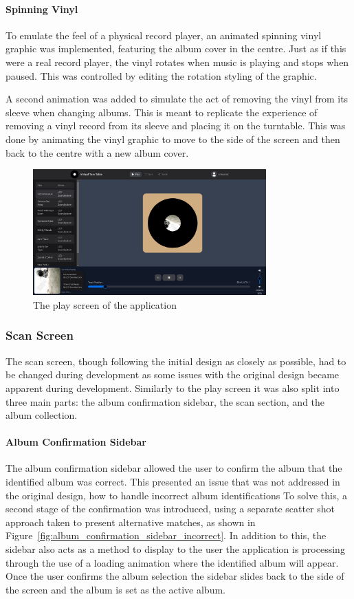 \paragraph{Spinning Vinyl}
To emulate the feel of a physical record player, an animated spinning vinyl graphic was implemented, featuring the album cover in the centre. Just as if this were a real record player, the vinyl rotates when music is playing and stops when paused. This was controlled by editing the rotation styling of the graphic.

A second animation was added to simulate the act of removing the vinyl from its sleeve when changing albums. This is meant to replicate the experience of removing a vinyl record from its sleeve and placing it on the turntable. This was done by animating the vinyl graphic to move to the side of the screen and then back to the centre with a new album cover.

\begin{figure} [H]
    \centering
    \includegraphics[width=0.8\textwidth]{figures/play_screen.png}
    \caption{The play screen of the application}
    \label{fig:play_screen}
\end{figure}

\subsubsection{Scan Screen}
The scan screen, though following the initial design as closely as possible, had to be changed during development as some issues with the original design became apparent during development. Similarly to the play screen it was also split into three main parts: the album confirmation sidebar, the scan section, and the album collection.

\paragraph{Album Confirmation Sidebar}
The album confirmation sidebar allowed the user to confirm the album that the identified album was correct. This presented an issue that was not addressed in the original design, how to handle incorrect album identifications To solve this, a second stage of the confirmation was introduced, using a separate scatter shot approach taken to present alternative matches, as shown in Figure~\ref{fig:album_confirmation_sidebar_incorrect}. In addition to this, the sidebar also acts as a method to display to the user the application is processing through the use of a loading animation where the identified album will appear. Once the user confirms the album selection the sidebar slides back to the side of the screen and the album is set as the active album.

